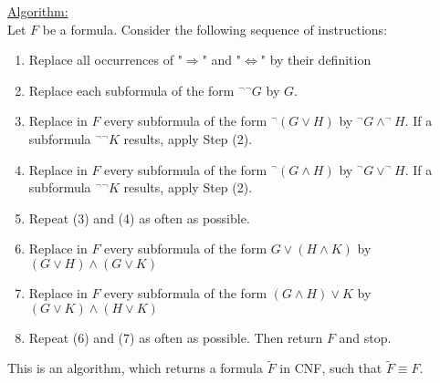 \documentclass[a4paper]{article}
\newcommand{\ul}{\underline}
\begin{document}
\ul{Algorithm:}\\
Let $F$ be a formula. Consider the following sequence of instructions:
\begin{enumerate}[(1)]
	\item Replace all occurrences of "$\Rightarrow$" and "$\Leftrightarrow$" by their definition
	\item Replace each subformula of the form $^\neg$$^\neg G$ by $G$.
	\item Replace in $F$ every subformula of the form $^\neg (G\vee H)$ by $^\neg G\wedge ^\neg H$. If a subformula $^\neg$$^\neg K$ results, apply Step (2).
	\item Replace in $F$ every subformula of the form $^\neg (G\wedge H)$ by $^\neg G\vee ^\neg H$. If a subformula $^\neg$$^\neg K$ results, apply Step (2).
	\item Repeat (3) and (4) as often as possible.
	\item Replace in $F$ every subformula of the form $G\vee (H\wedge K)$ by $(G\vee H)\wedge (G\vee K)$
	\item Replace in $F$ every subformula of the form $(G\wedge H)\vee K$ by $(G\vee K)\wedge (H\vee K)$
	\item Repeat (6) and (7) as often as possible. Then return $F$ and stop.
\end{enumerate}
This is an algorithm, which returns a formula $\tilde{F}$ in CNF, such that $\tilde{F}\equiv F$.
\end{document}
